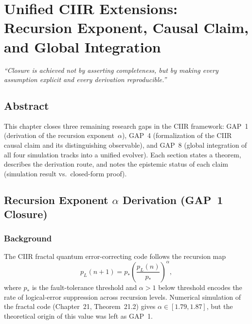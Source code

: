 \chapter{Unified CIIR Extensions: Recursion Exponent, Causal Claim, and Global Integration}
\label{ch:unified-extensions}

\begin{center}
\textit{%
``Closure is achieved not by asserting completeness, but by making
every assumption explicit and every derivation reproducible.''}
\end{center}

\section*{Abstract}
\label{sec:ch22-abstract}

This chapter closes three remaining research gaps in the CIIR framework:
GAP~1 (derivation of the recursion exponent~$\alpha$), GAP~4 (formalization
of the CIIR causal claim and its distinguishing observable), and GAP~8
(global integration of all four simulation tracks into a unified evolver).
Each section states a theorem, describes the derivation route, and notes the
epistemic status of each claim (simulation result vs.\ closed-form proof).

\section{Recursion Exponent \texorpdfstring{$\alpha$}{alpha} Derivation (GAP~1 Closure)}
\label{sec:ch22-alpha}

\subsection{Background}

The CIIR fractal quantum error-correcting code follows the recursion map
\begin{equation}
  p_{L}(n+1) = p_* \!\left(\frac{p_{L}(n)}{p_*}\right)^{\!\alpha},
  \label{eq:ch22-recursion}
\end{equation}
where $p_*$ is the fault-tolerance threshold and $\alpha > 1$ below threshold
encodes the rate of logical-error suppression across recursion levels.
Numerical simulation of the fractal code (Chapter~21, Theorem~21.2) gives
$\alpha \in [1.79, 1.87]$, but the theoretical origin of this value was left
as GAP~1.

